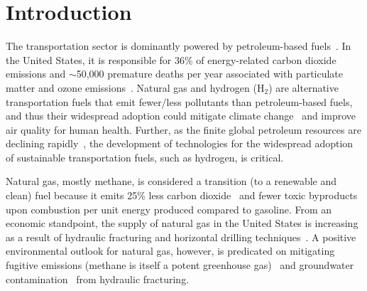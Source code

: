 \documentclass[twoside,twocolumn,9pt]{article}
\begin{document}





\section{Introduction}
The transportation sector is dominantly powered by petroleum-based
fuels~\cite{davis2009transportation}. In the United States, it is responsible
for 36\% of energy-related carbon dioxide emissions \cite{useia} and $\sim$50,000
premature deaths per year associated with particulate matter and ozone
emissions~\cite{caiazzo2013air}. Natural gas and hydrogen (H$_2$) are
alternative transportation fuels that emit fewer/less pollutants than
petroleum-based fuels, and thus their widespread adoption could mitigate
climate change~\cite{mcglade2015geographical} and improve air quality for human
health. Further, as the finite global petroleum resources are declining
rapidly~\cite{sorrell2010global}, the development of technologies for the
widespread adoption of sustainable transportation fuels, such as hydrogen, is
critical.

Natural gas, mostly methane, is considered a transition (to a renewable and
clean) fuel because it emits 25\% less carbon dioxide~\cite{eia2013much} and
fewer toxic byproducts~\cite{wang2000full} upon combustion per unit energy
produced compared to gasoline. From an economic standpoint, the supply of
natural gas in the United States is increasing as a result of hydraulic
fracturing and horizontal drilling techniques~\cite{usnatgassupply}. A positive
environmental outlook for natural gas, however, is predicated on mitigating
fugitive emissions (methane is itself a potent greenhouse
gas)~\cite{alvarez2012greater} and groundwater
contamination~\cite{osborn2011methane} from hydraulic fracturing.
\end{document}
